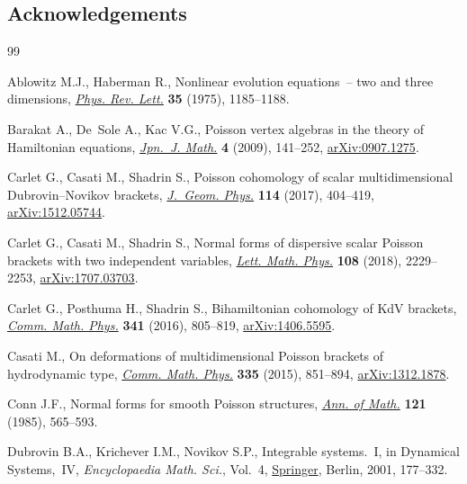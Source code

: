 \documentclass[10pt,a4paper]{amsart}
\numberwithin{equation}{section}
\begin{document}
\subsection*{Acknowledgements}

\begin{thebibliography}{99}
\footnotesize\itemsep=0pt

Ablowitz M.J., Haberman R., Nonlinear evolution equations~-- two and three
 dimensions, \href{https://doi.org/10.1103/PhysRevLett.35.1185}{\textit{Phys. Rev. Lett.}} \textbf{35} (1975), 1185--1188.

Barakat A., De~Sole A., Kac V.G., Poisson vertex algebras in the theory of
 {H}amiltonian equations, \href{https://doi.org/10.1007/s11537-009-0932-y}{\textit{Jpn.~J. Math.}} \textbf{4} (2009), 141--252,
 \href{https://arxiv.org/abs/0907.1275}{arXiv:0907.1275}.

Carlet G., Casati M., Shadrin S., Poisson cohomology of scalar multidimensional
 {D}ubrovin--{N}ovikov brackets, \href{https://doi.org/10.1016/j.geomphys.2016.12.008}{\textit{J.~Geom. Phys.}} \textbf{114} (2017),
 404--419, \href{https://arxiv.org/abs/1512.05744}{arXiv:1512.05744}.

Carlet G., Casati M., Shadrin S., Normal forms of dispersive scalar {P}oisson
 brackets with two independent variables, \href{https://doi.org/10.1007/s11005-018-1076-x}{\textit{Lett. Math. Phys.}}
 \textbf{108} (2018), 2229--2253, \href{https://arxiv.org/abs/1707.03703}{arXiv:1707.03703}.

Carlet G., Posthuma H., Shadrin S., Bihamiltonian cohomology of {K}d{V}
 brackets, \href{https://doi.org/10.1007/s00220-015-2540-4}{\textit{Comm. Math. Phys.}} \textbf{341} (2016), 805--819,
 \href{https://arxiv.org/abs/1406.5595}{arXiv:1406.5595}.

Casati M., On deformations of multidimensional {P}oisson brackets of
 hydrodynamic type, \href{https://doi.org/10.1007/s00220-014-2219-2}{\textit{Comm. Math. Phys.}} \textbf{335} (2015), 851--894,
 \href{https://arxiv.org/abs/1312.1878}{arXiv:1312.1878}.

Conn J.F., Normal forms for smooth {P}oisson structures, \href{https://doi.org/10.2307/1971210}{\textit{Ann. of Math.}}
 \textbf{121} (1985), 565--593.

Dubrovin B.A., Krichever I.M., Novikov S.P., Integrable systems.~{I}, in
 Dynamical {S}ystems,~{IV}, \textit{Encyclopaedia Math. Sci.}, Vol.~4,
 \href{https://doi.org/10.1007/978-3-662-06791-8_3}{Springer}, Berlin, 2001, 177--332.


\end{thebibliography}
\end{document}
